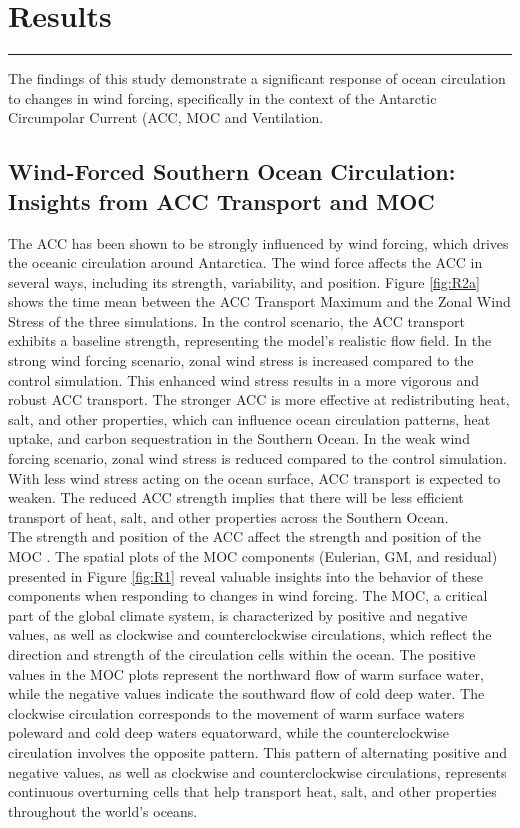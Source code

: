 \documentclass[12pt]{article}
\begin{document}
\newpage
\section{Results}
\rule{\textwidth}{0.4pt}
The findings of this study demonstrate a significant response of ocean circulation to changes in wind forcing, specifically in the context of the Antarctic Circumpolar Current (ACC, MOC and Ventilation. 

\subsection{Wind-Forced Southern Ocean Circulation: Insights from ACC Transport and MOC}

The ACC has been shown to be strongly influenced by wind forcing, which drives the oceanic circulation around Antarctica. The wind force affects the ACC in several ways, including its strength, variability, and position. Figure \ref{fig:R2a} shows the time mean between the ACC Transport Maximum and the Zonal Wind Stress of the three simulations. In the control scenario, the ACC transport exhibits a baseline strength, representing the model's realistic flow field. In the strong wind forcing scenario, zonal wind stress is increased compared to the control simulation. This enhanced wind stress results in a more vigorous and robust ACC transport. The stronger ACC is more effective at redistributing heat, salt, and other properties, which can influence ocean circulation patterns, heat uptake, and carbon sequestration in the Southern Ocean. In the weak wind forcing scenario, zonal wind stress is reduced compared to the control simulation. With less wind stress acting on the ocean surface, ACC transport is expected to weaken. The reduced ACC strength implies that there will be less efficient transport of heat, salt, and other properties across the Southern Ocean.\\


\noindent The strength and position of the ACC affect the strength and position of the MOC \citep{marshall2012closure}. The spatial plots of the MOC components (Eulerian, GM, and residual) presented in Figure \ref{fig:R1} reveal valuable insights into the behavior of these components when responding to changes in wind forcing. The MOC, a critical part of the global climate system, is characterized by positive and negative values, as well as clockwise and counterclockwise circulations, which reflect the direction and strength of the circulation cells within the ocean. The positive values in the MOC plots represent the northward flow of warm surface water, while the negative values indicate the southward flow of cold deep water. The clockwise circulation corresponds to the movement of warm surface waters poleward and cold deep waters equatorward, while the counterclockwise circulation involves the opposite pattern. This pattern of alternating positive and negative values, as well as clockwise and counterclockwise circulations, represents continuous overturning cells that help transport heat, salt, and other properties throughout the world's oceans.\\
\end{document}
